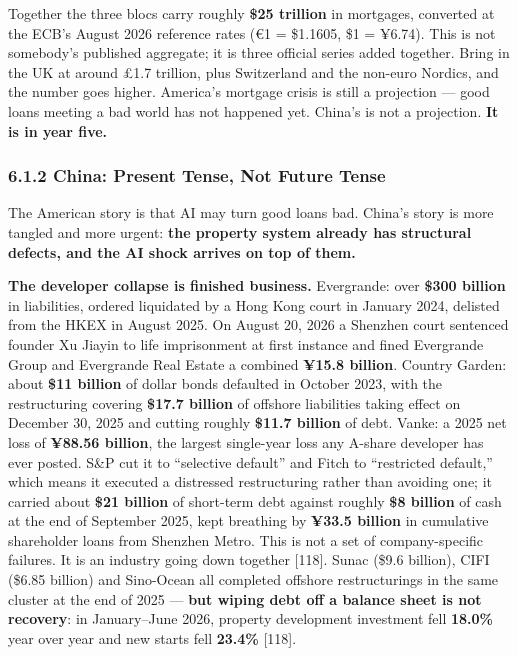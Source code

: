 \documentclass[11pt,a4paper]{article}
\begin{document}
Together the three blocs carry roughly \textbf{\$25 trillion} in mortgages, converted at the ECB's August 2026 reference rates (€1 = \$1.1605, \$1 = ¥6.74). This is not somebody's published aggregate; it is three official series added together. Bring in the UK at around £1.7 trillion, plus Switzerland and the non-euro Nordics, and the number goes higher. America's mortgage crisis is still a projection --- good loans meeting a bad world has not happened yet. China's is not a projection. \textbf{It is in year five.}

\subsubsection{6.1.2 China: Present Tense, Not Future Tense}

The American story is that AI may turn good loans bad. China's story is more tangled and more urgent: \textbf{the property system already has structural defects, and the AI shock arrives on top of them.}

\textbf{The developer collapse is finished business.} Evergrande: over \textbf{\$300 billion} in liabilities, ordered liquidated by a Hong Kong court in January 2024, delisted from the HKEX in August 2025. On August 20, 2026 a Shenzhen court sentenced founder Xu Jiayin to life imprisonment at first instance and fined Evergrande Group and Evergrande Real Estate a combined \textbf{¥15.8 billion}. Country Garden: about \textbf{\$11 billion} of dollar bonds defaulted in October 2023, with the restructuring covering \textbf{\$17.7 billion} of offshore liabilities taking effect on December 30, 2025 and cutting roughly \textbf{\$11.7 billion} of debt. Vanke: a 2025 net loss of \textbf{¥88.56 billion}, the largest single-year loss any A-share developer has ever posted. S\&P cut it to ``selective default'' and Fitch to ``restricted default,'' which means it executed a distressed restructuring rather than avoiding one; it carried about \textbf{\$21 billion} of short-term debt against roughly \textbf{\$8 billion} of cash at the end of September 2025, kept breathing by \textbf{¥33.5 billion} in cumulative shareholder loans from Shenzhen Metro. This is not a set of company-specific failures. It is an industry going down together [118]. Sunac (\$9.6 billion), CIFI (\$6.85 billion) and Sino-Ocean all completed offshore restructurings in the same cluster at the end of 2025 --- \textbf{but wiping debt off a balance sheet is not recovery}: in January--June 2026, property development investment fell \textbf{18.0\%} year over year and new starts fell \textbf{23.4\%}{} [118].
\end{document}
